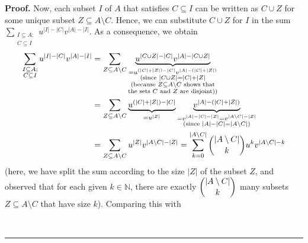 \documentclass[numbers=enddot,12pt,final,onecolumn,notitlepage]{scrartcl}%
\theoremstyle{definition}
\newenvironment{proof}[1][Proof]{\noindent\textbf{#1.} }{\ \rule{0.5em}{0.5em}}
\let\sumnonlimits\sum
\renewcommand{\sum}{\sumnonlimits\limits}
\newenvironment{vershort}{}{}
\begin{document}
\begin{vershort}
\begin{proof}
Now, each subset $I$ of $A$ that satisfies $C\subseteq I$ can be written as
$C\cup Z$ for some unique subset $Z\subseteq A\setminus C$. Hence, we can
substitute $C\cup Z$ for $I$ in the sum $\sum_{\substack{I\subseteq
A;\\C\subseteq I}}u^{\left\vert I\right\vert -\left\vert C\right\vert
}v^{\left\vert A\right\vert -\left\vert I\right\vert }$. As a consequence, we
obtain%
\begin{align*}
\sum_{\substack{I\subseteq A;\\C\subseteq I}}u^{\left\vert I\right\vert
-\left\vert C\right\vert }v^{\left\vert A\right\vert -\left\vert I\right\vert
}  &  =\sum_{Z\subseteq A\setminus C}\underbrace{u^{\left\vert C\cup
Z\right\vert -\left\vert C\right\vert }v^{\left\vert A\right\vert -\left\vert
C\cup Z\right\vert }}_{\substack{=u^{\left(  \left\vert C\right\vert
+\left\vert Z\right\vert \right)  -\left\vert C\right\vert }v^{\left\vert
A\right\vert -\left(  \left\vert C\right\vert +\left\vert Z\right\vert
\right)  }\\\text{(since }\left\vert C\cup Z\right\vert =\left\vert
C\right\vert +\left\vert Z\right\vert \\\text{(because }Z\subseteq A\setminus
C\text{ shows that}\\\text{the sets }C\text{ and }Z\text{ are disjoint))}}}\\
&  =\sum_{Z\subseteq A\setminus C}\underbrace{u^{\left(  \left\vert
C\right\vert +\left\vert Z\right\vert \right)  -\left\vert C\right\vert }%
}_{=u^{\left\vert Z\right\vert }}\underbrace{v^{\left\vert A\right\vert
-\left(  \left\vert C\right\vert +\left\vert Z\right\vert \right)  }%
}_{\substack{=v^{\left\vert A\right\vert -\left\vert C\right\vert -\left\vert
Z\right\vert }=v^{\left\vert A\setminus C\right\vert -\left\vert Z\right\vert
}\\\text{(since }\left\vert A\right\vert -\left\vert C\right\vert =\left\vert
A\setminus C\right\vert \text{)}}}\\
&  =\sum_{Z\subseteq A\setminus C}u^{\left\vert Z\right\vert }v^{\left\vert
A\setminus C\right\vert -\left\vert Z\right\vert }=\sum_{k=0}^{\left\vert
A\setminus C\right\vert }\dbinom{\left\vert A\setminus C\right\vert }{k}%
u^{k}v^{\left\vert A\setminus C\right\vert -k}%
\end{align*}
(here, we have split the sum according to the size $\left\vert Z\right\vert $
of the subset $Z$, and observed that for each given $k\in\mathbb{N}$, there
are exactly $\dbinom{\left\vert A\setminus C\right\vert }{k}$ many subsets
$Z\subseteq A\setminus C$ that have size $k$). Comparing this with%

\end{proof}
\end{vershort}
\end{document}

